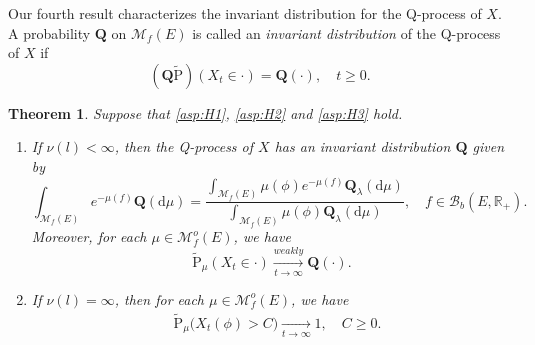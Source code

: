 \documentclass[12pt,a4paper]{amsart}
\numberwithin{equation}{section}
\theoremstyle{plain}
\newtheorem{thm}{Theorem}[section]
\theoremstyle{definition}
\theoremstyle{remark}
\begin{document}
	Our fourth result characterizes the invariant distribution for the Q-process of $X$.
	A probability $\mathbf Q$ on $\mathcal M_f(E)$ is called an \emph{invariant distribution} of the Q-process of $X$ if
\[
	(\mathbf Q\widetilde{\mathrm P})(X_t \in \cdot )
	=\mathbf Q(\cdot),	\quad t\geq 0.
\]

\begin{thm}\label{thm:I}
	Suppose that \eqref{asp:H1}, \eqref{asp:H2} and \eqref{asp:H3} hold.
\begin{enumerate}
\item
	If $\nu(l)<\infty$, then the Q-process of $X$ has an invariant distribution $\mathbf Q$ given by
\[
	\int_{{\mathcal M}_f(E)} e^{-\mu(f)}\mathbf Q(\mathrm d\mu)
	=\frac{\int_{{\mathcal M}_f(E)}\mu(\phi)e^{-\mu(f)}\mathbf Q_\lambda({\mathrm d}\mu)} {\int_{{\mathcal M}_f(E)}\mu(\phi)\mathbf Q_\lambda({\mathrm d}\mu)}, \quad f\in \mathcal B_b(E, \mathbb R_+).
\]	
Moreover, for each $\mu\in\mathcal M^o_f(E)$, we have
\[
	\widetilde{\mathrm P}_\mu(X_t \in \cdot ) 
	\xrightarrow[t\to \infty]{weakly} {\mathbf Q}(\cdot).
\]
\item
	If $\nu(l) = \infty$, then for each $\mu \in \mathcal M^o_f(E)$, we have
\begin{align}
	& \widetilde{\mathrm P}_\mu\big(X_t(\phi) > C\big) 
	\xrightarrow[t\to \infty]{} 1, \quad C\geq 0.
\end{align}
\end{enumerate}
\end{thm}
\end{document}
